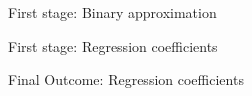 \documentclass[notes,11pt, aspectratio=169]{beamer}
\begin{document}
\begin{frame}{First stage: Binary approximation}
\end{frame}
\begin{frame}{First stage: Regression coefficients}
\end{frame}
\begin{frame}{Final Outcome: Regression coefficients}
\end{frame}
\end{document}
